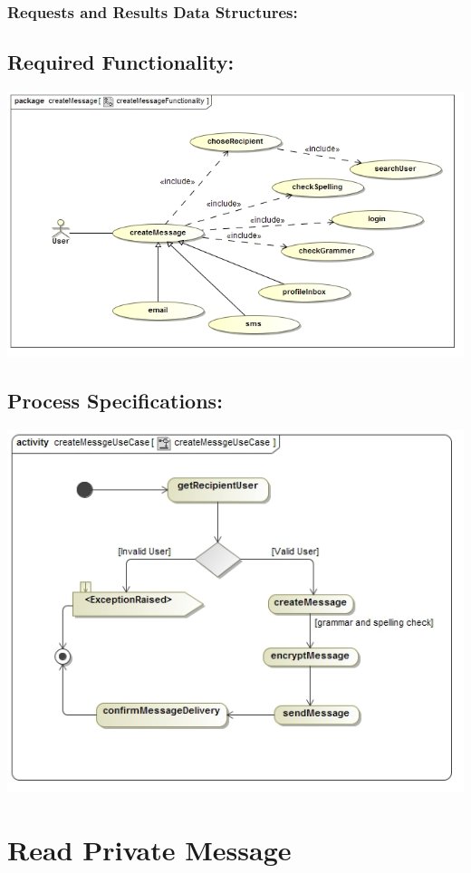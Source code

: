 \documentclass[a4paper,11pt]{article}
\begin{document}
\subsubsection*{Requests and Results Data Structures:}
\subsection{Required Functionality:} 
\includegraphics[width=1\linewidth]{./Images/PrivateMessage/createMessageFunctionality}
\subsection{Process Specifications:} 
\includegraphics[width=1\linewidth]{./Images/PrivateMessage/createMessgeActivity}

\section{Read Private Message}
\end{document}

